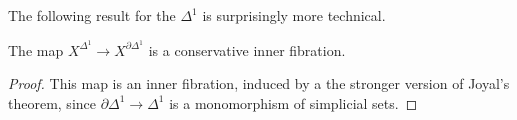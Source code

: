 The following result for the $\Delta^{1}$ is surprisingly more technical. 
\begin{lemma}\label{lem: conservativity of one simplex}
    The map $X^{\Delta^{1}}\to X^{\partial\Delta^{1}}$ is a conservative inner fibration. 
\end{lemma}
\begin{proof}
    This map is an inner fibration, induced by a the stronger version of Joyal's theorem, since $\partial\Delta^{1}\to\Delta^{1}$ is a monomorphism of simplicial sets. 
\end{proof}